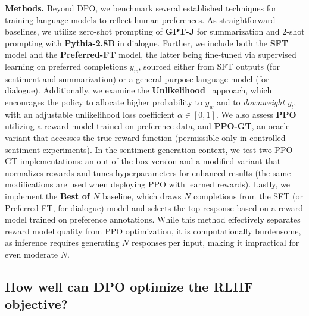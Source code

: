 \textbf{Methods.} Beyond DPO, we benchmark several established techniques for training language models to reflect human preferences. As straightforward baselines, we utilize zero-shot prompting of \textbf{GPT-J} \citep{gpt-j} for summarization and 2-shot prompting with \textbf{Pythia-2.8B} \citep{biderman2023pythia} in dialogue. Further, we include both the \textbf{SFT} model and the \textbf{Preferred-FT} model, the latter being fine-tuned via supervised learning on preferred completions $y_w$, sourced either from SFT outputs (for sentiment and summarization) or a general-purpose language model (for dialogue). Additionally, we examine the \textbf{Unlikelihood}~\citep{welleck2019neural} approach, which encourages the policy to allocate higher probability to $y_w$ and to \textit{downweight} $y_l$, with an adjustable unlikelihood loss coefficient $\alpha\in[0,1]$. We also assess \textbf{PPO} \citep{schulman2017proximal} utilizing a reward model trained on preference data, and \textbf{PPO-GT}, an oracle variant that accesses the true reward function (permissible only in controlled sentiment experiments). In the sentiment generation context, we test two PPO-GT implementations: an out-of-the-box version \cite{leandro_von_werra_2023_7790115} and a modified variant that normalizes rewards and tunes hyperparameters for enhanced results (the same modifications are used when deploying PPO with learned rewards). Lastly, we implement the \textbf{Best of $N$} baseline, which draws $N$ completions from the SFT (or Preferred-FT, for dialogue) model and selects the top response based on a reward model trained on preference annotations. While this method effectively separates reward model quality from PPO optimization, it is computationally burdensome, as inference requires generating $N$ responses per input, making it impractical for even moderate $N$.

\subsection{How well can DPO optimize the RLHF objective?}


